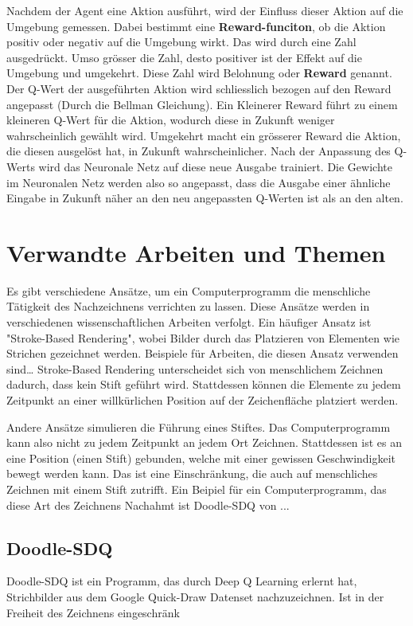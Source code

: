 Nachdem der Agent eine Aktion ausführt, wird der Einfluss dieser Aktion auf die
Umgebung gemessen. Dabei bestimmt eine \textbf{Reward-funciton}, ob die Aktion
positiv oder negativ auf die Umgebung wirkt. Das wird durch eine Zahl
ausgedrückt. Umso grösser die Zahl, desto positiver ist der Effekt auf die
Umgebung und umgekehrt. Diese Zahl wird Belohnung oder \textbf{Reward} genannt.
Der Q-Wert der ausgeführten Aktion wird schliesslich bezogen auf den Reward
angepasst (Durch die Bellman Gleichung). Ein Kleinerer Reward führt zu einem
kleineren Q-Wert für die Aktion, wodurch diese in Zukunft weniger wahrscheinlich
gewählt wird. Umgekehrt macht ein grösserer Reward die Aktion, die diesen
ausgelöst hat, in Zukunft wahrscheinlicher. Nach der Anpassung des Q-Werts wird
das Neuronale Netz auf diese neue Ausgabe trainiert. Die Gewichte im Neuronalen
Netz werden also so angepasst, dass die Ausgabe einer ähnliche Eingabe in
Zukunft näher an den neu angepassten Q-Werten ist als an den alten.





\section{Verwandte Arbeiten und Themen}
\label{chap:t_verwandt}
Es gibt verschiedene Ansätze, um ein Computerprogramm die menschliche Tätigkeit
des Nachzeichnens verrichten zu lassen. Diese Ansätze werden in verschiedenen
wissenschaftlichen Arbeiten verfolgt. Ein häufiger Ansatz ist "Stroke-Based
Rendering", wobei Bilder durch das Platzieren von Elementen wie Strichen
gezeichnet werden. Beispiele für Arbeiten, die diesen Ansatz verwenden sind\dots
Stroke-Based Rendering unterscheidet sich von menschlichem Zeichnen dadurch,
dass kein Stift geführt wird. Stattdessen können die Elemente zu jedem Zeitpunkt
an einer willkürlichen Position auf der Zeichenfläche platziert werden.

Andere Ansätze simulieren die Führung eines Stiftes. Das Computerprogramm kann
also nicht zu jedem Zeitpunkt an jedem Ort Zeichnen. Stattdessen ist es an eine
Position (einen Stift) gebunden, welche mit einer gewissen Geschwindigkeit
bewegt werden kann. Das ist eine Einschränkung, die auch auf menschliches
Zeichnen mit einem Stift zutrifft. Ein Beipiel für ein Computerprogramm, das diese Art des Zeichnens Nachahmt ist
Doodle-SDQ von ...


\subsection*{Doodle-SDQ}
Doodle-SDQ ist ein Programm, das durch Deep Q Learning erlernt hat, Strichbilder
aus dem Google Quick-Draw Datenset nachzuzeichnen. Ist in der Freiheit des
Zeichnens eingeschränk\indent 

